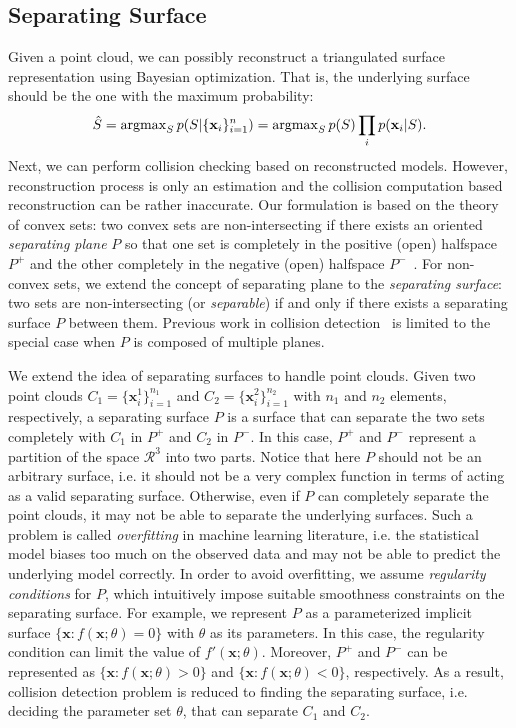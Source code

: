 \subsection{Separating Surface}
\label{sec:7:overview:2}
Given a point cloud, we can possibly reconstruct a triangulated surface representation using Bayesian optimization. That is, the underlying surface should be the one with the maximum probability:
\begin{equation}
\hat{S} = \operatorname{argmax}_S p(S|\{\mathbf x_i\}_{i=1}^n) = \operatorname{argmax}_S p(S) \prod_i p(\mathbf x_i | S).
\end{equation}
Next, we can perform collision checking based on reconstructed models. However, reconstruction process is only an estimation and the
collision computation based reconstruction can be rather inaccurate.
Our formulation is based on the theory of convex sets: two convex sets are non-intersecting if there exists an oriented \emph{separating plane} $P$ so that one set is completely in the positive (open) halfspace $P^+$ and the other completely in the negative (open) halfspace $P^-$~\cite{Mount:2004}. For non-convex sets, we extend the concept of separating plane to the \emph{separating surface}: two sets are non-intersecting (or \emph{separable}) if and only if there exists a separating surface $P$ between them. Previous work in collision detection~\cite{Mount:2004, Ponamgi:1995} is limited to the special case when $P$ is composed of multiple planes.

We extend the idea of separating surfaces to handle point clouds. Given two point clouds $C_1 = \{\mathbf x_i^1\}_{i=1}^{n_1}$ and $C_2 = \{\mathbf x_i^2\}_{i=1}^{n_2}$
with $n_1$ and $n_2$ elements, respectively, a separating surface $P$ is a surface that can separate the two sets completely with $C_1$ in $P^+$ and $C_2$ in $P^-$.
In this case, $P^+$ and $P^-$ represent a partition of the space $\mathcal{R}^3$ into two parts. Notice that here $P$ should not be an
arbitrary surface, i.e. it should not be a very complex function in terms of acting as a valid separating surface. Otherwise, even if $P$ can completely separate the point clouds, it may not be able to separate the underlying surfaces. Such a problem is called \emph{overfitting} in machine learning literature, i.e. the statistical model biases too much on the observed data and may not be able to predict the underlying model correctly. In order to avoid overfitting, we assume \emph{regularity conditions} for $P$, which intuitively impose suitable smoothness constraints on the separating surface. For example, we represent $P$ as a parameterized implicit surface $\{\mathbf x: f(\mathbf x; \theta) = 0\}$ with $\theta$ as its parameters. In this case, the regularity condition can limit the value of $f'(\mathbf x; \theta)$. Moreover, $P^+$ and $P^-$ can be represented as $\{\mathbf x: f(\mathbf x; \theta) > 0\}$ and $\{\mathbf x: f(\mathbf x; \theta) < 0\}$, respectively. As a result, collision detection problem is reduced to finding the separating surface, i.e. deciding the parameter set $\theta$, that can separate $C_1$ and $C_2$.

